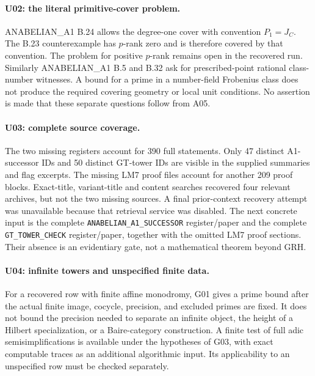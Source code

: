 \documentclass[11pt,a4paper]{article}
\begin{document}
\paragraph{U02: the literal primitive-cover problem.}
ANABELIAN\_A1 B.24 allows the degree-one cover with convention
$P_1=J_C$. The B.23 counterexample has $p$-rank zero and is therefore
covered by that convention. The problem for positive $p$-rank
remains open in the recovered run. Similarly ANABELIAN\_A1 B.5 and
B.32 ask for prescribed-point rational class-number witnesses.
A bound for a prime in a number-field Frobenius class does not
produce the required covering geometry or local unit conditions.
No assertion is made that these separate questions follow from A05.

\paragraph{U03: complete source coverage.}
The two missing registers account for 390 full statements. Only
47 distinct A1-successor IDs and 50 distinct GT-tower IDs are visible
in the supplied summaries and flag excerpts. The missing LM7
proof files account for another 209 proof blocks. Exact-title,
variant-title and content searches recovered four relevant archives,
but not the two missing sources. A final prior-context recovery
attempt was unavailable because that retrieval service was disabled.
The next concrete input is the complete
\texttt{ANABELIAN\_A1\_SUCCESSOR} register/paper and the complete
\texttt{GT\_TOWER\_CHECK} register/paper, together with the omitted
LM7 proof sections. Their absence is an evidentiary gate, not a
mathematical theorem beyond GRH.

\paragraph{U04: infinite towers and unspecified finite data.}
For a recovered row with finite affine monodromy, G01 gives a
prime bound after the actual finite image, cocycle, precision,
and excluded primes are fixed. It does not bound the precision
needed to separate an infinite object, the height of a Hilbert
specialization, or a Baire-category construction. A finite test of
full adic semisimplifications is available under the hypotheses of
G03, with exact computable traces as an additional algorithmic input.
Its applicability to an unspecified row must be checked separately.
\end{document}
